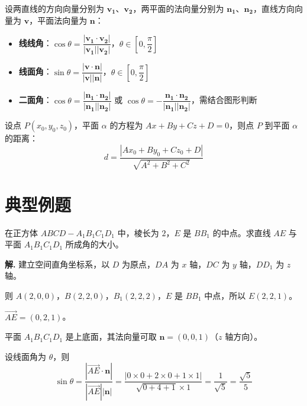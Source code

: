 \documentclass[11pt]{ctexrep}
\begin{document}
\begin{property}[空间角的向量求法]
    设两直线的方向向量分别为 $\boldsymbol{v_1}$、$\boldsymbol{v_2}$，两平面的法向量分别为 $\boldsymbol{n_1}$、$\boldsymbol{n_2}$，直线方向向量为 $\boldsymbol{v}$，平面法向量为 $\boldsymbol{n}$：
    \begin{itemize}
        \item \textbf{线线角}：$\cos\theta = \dfrac{|\boldsymbol{v_1} \cdot \boldsymbol{v_2}|}{|\boldsymbol{v_1}||\boldsymbol{v_2}|}$，$\theta \in \left[0, \dfrac{\pi}{2}\right]$
        \item \textbf{线面角}：$\sin\theta = \dfrac{|\boldsymbol{v} \cdot \boldsymbol{n}|}{|\boldsymbol{v}||\boldsymbol{n}|}$，$\theta \in \left[0, \dfrac{\pi}{2}\right]$
        \item \textbf{二面角}：$\cos\theta = \dfrac{|\boldsymbol{n_1} \cdot \boldsymbol{n_2}|}{|\boldsymbol{n_1}||\boldsymbol{n_2}|}$ 或 $\cos\theta = -\dfrac{\boldsymbol{n_1} \cdot \boldsymbol{n_2}}{|\boldsymbol{n_1}||\boldsymbol{n_2}|}$，需结合图形判断
    \end{itemize}
\end{property}

\begin{property}[空间距离的向量求法]
    设点 $P(x_0, y_0, z_0)$，平面 $\alpha$ 的方程为 $Ax + By + Cz + D = 0$，则点 $P$ 到平面 $\alpha$ 的距离：
    \[
    d = \dfrac{|Ax_0 + By_0 + Cz_0 + D|}{\sqrt{A^2 + B^2 + C^2}}
    \]
\end{property}

\section*{典型例题}

\begin{example}[建立坐标系求线面角]
    在正方体 $ABCD-A_1B_1C_1D_1$ 中，棱长为 $2$，$E$ 是 $BB_1$ 的中点。求直线 $AE$ 与平面 $A_1B_1C_1D_1$ 所成角的大小。
\end{example}

\textbf{解.} 建立空间直角坐标系，以 $D$ 为原点，$DA$ 为 $x$ 轴，$DC$ 为 $y$ 轴，$DD_1$ 为 $z$ 轴。

则 $A(2, 0, 0)$，$B(2, 2, 0)$，$B_1(2, 2, 2)$，$E$ 是 $BB_1$ 中点，所以 $E(2, 2, 1)$。

$\overrightarrow{AE} = (0, 2, 1)$。

平面 $A_1B_1C_1D_1$ 是上底面，其法向量可取 $\boldsymbol{n} = (0, 0, 1)$（$z$ 轴方向）。

设线面角为 $\theta$，则
\[
\sin\theta = \dfrac{|\overrightarrow{AE} \cdot \boldsymbol{n}|}{|\overrightarrow{AE}||\boldsymbol{n}|} = \dfrac{|0 \times 0 + 2 \times 0 + 1 \times 1|}{\sqrt{0 + 4 + 1} \times 1} = \dfrac{1}{\sqrt{5}} = \dfrac{\sqrt{5}}{5}
\]
\end{document}
